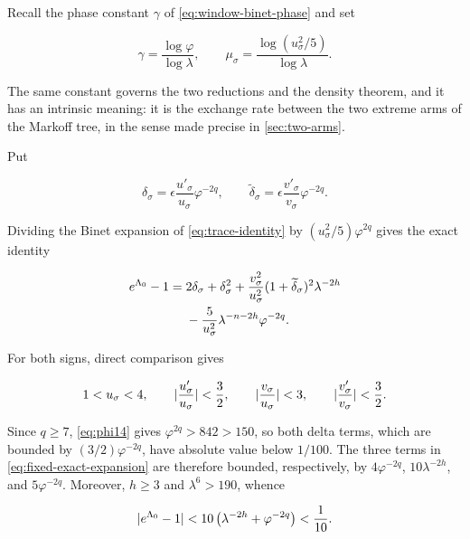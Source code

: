 Recall the phase constant $\gamma$ of \cref{eq:window-binet-phase} and set

\begin{equation}
 \gamma=\frac{\log\varphi}{\log\lambda},
 \qquad
 \mu_\sigma
 =\frac{\log(u_\sigma^2/5)}{\log\lambda}.
 \label{eq:gamma-mu}
\end{equation}

The same constant governs the two reductions and the density theorem, and it
has an intrinsic meaning: it is the exchange rate between the two extreme
arms of the Markoff tree, in the sense made precise in
\cref{sec:two-arms}.

Put

\begin{equation}
 \delta_\sigma
 =\epsilon\frac{u'_\sigma}{u_\sigma}\varphi^{-2q},
 \qquad
 \widetilde\delta_\sigma
 =\epsilon\frac{v'_\sigma}{v_\sigma}\varphi^{-2q}.
\end{equation}

Dividing the Binet expansion of \cref{eq:trace-identity} by
$(u_\sigma^2/5)\varphi^{2q}$ gives the exact identity

\begin{align}
 e^{\Lambda_0}-1
 ={}&
 2\delta_\sigma+\delta_\sigma^2
 +\frac{v_\sigma^2}{u_\sigma^2}
  (1+\widetilde\delta_\sigma)^2\lambda^{-2h}\notag\\
 &-\frac5{u_\sigma^2}
  \lambda^{-n-2h}\varphi^{-2q}.
 \label{eq:fixed-exact-expansion}
\end{align}

For both signs, direct comparison gives

\begin{equation}
 1<u_\sigma<4,\qquad
 \lvert\frac{u'_\sigma}{u_\sigma}\rvert<\frac32,\qquad
 \lvert\frac{v_\sigma}{u_\sigma}\rvert<3,\qquad
 \lvert\frac{v'_\sigma}{v_\sigma}\rvert<\frac32.
\end{equation}

Since $q\geqslant7$, \cref{eq:phi14} gives $\varphi^{2q}>842>150$, so both
delta terms, which are bounded by $(3/2)\varphi^{-2q}$, have absolute value
below $1/100$. The three terms in
\cref{eq:fixed-exact-expansion} are therefore bounded, respectively, by
$4\varphi^{-2q}$, $10\lambda^{-2h}$, and $5\varphi^{-2q}$. Moreover,
$h\geqslant3$ and $\lambda^6>190$, whence

\begin{equation}
 \lvert e^{\Lambda_0}-1\rvert
 <10\left(\lambda^{-2h}+\varphi^{-2q}\right)<\frac1{10}.
\end{equation}

